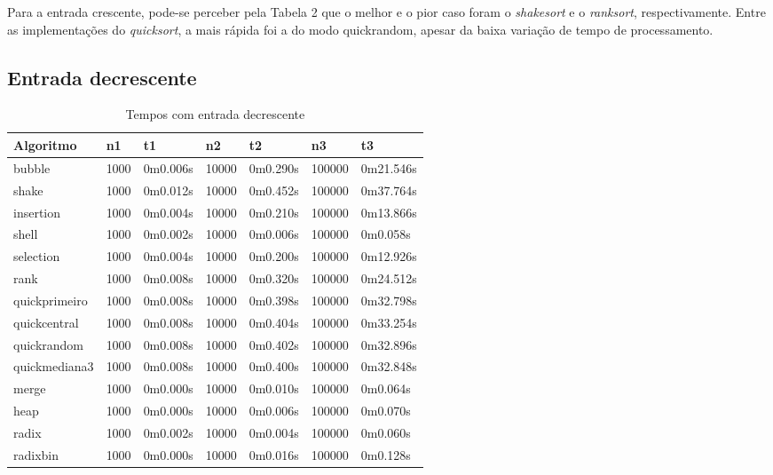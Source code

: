 \documentclass[
	article,			%
	11pt,				%
	oneside,			%
	a4paper,			%
	english,			%
	brazil,				%
	sumario=tradicional
	]{abntex2}
\begin{document}
Para a entrada crescente, pode-se perceber pela Tabela 2 que o melhor e o pior caso foram o \emph{shakesort} e o \emph{ranksort}, respectivamente. Entre as implementações do \emph{quicksort}, a mais rápida foi a do modo quickrandom, apesar da baixa variação de tempo de processamento.

\subsection{Entrada decrescente}

\begin{table}[!h]
\centering
\caption{Tempos com entrada decrescente}
\label{my-label}
\begin{tabular}{|l|l|l|l|l|l|l|}
\hline
Algoritmo     & n1 & t1 & n2 & t2 & n3 & t3 \\ \hline
bubble        & 1000   & 0m0.006s   & 10000   & 0m0.290s   & 100000   & 0m21.546s   \\ \hline
shake         & 1000   & 0m0.012s   & 10000   & 0m0.452s   & 100000   & 0m37.764s   \\ \hline
insertion     & 1000   & 0m0.004s   & 10000   & 0m0.210s   & 100000   & 0m13.866s   \\ \hline
shell         & 1000   & 0m0.002s   & 10000   & 0m0.006s   & 100000   & 0m0.058s   \\ \hline
selection     & 1000   & 0m0.004s   & 10000   & 0m0.200s   & 100000   & 0m12.926s   \\ \hline
rank          & 1000   & 0m0.008s   & 10000   & 0m0.320s   & 100000   & 0m24.512s   \\ \hline
quickprimeiro & 1000   & 0m0.008s   & 10000   & 0m0.398s   & 100000   & 0m32.798s   \\ \hline
quickcentral  & 1000   & 0m0.008s   & 10000   & 0m0.404s   & 100000   & 0m33.254s   \\ \hline
quickrandom   & 1000   & 0m0.008s   & 10000   & 0m0.402s   & 100000   & 0m32.896s   \\ \hline
quickmediana3 & 1000   & 0m0.008s   & 10000   & 0m0.400s   & 100000   & 0m32.848s   \\ \hline
merge         & 1000   & 0m0.000s   & 10000   & 0m0.010s   & 100000   & 0m0.064s   \\ \hline
heap          & 1000   & 0m0.000s   & 10000   & 0m0.006s   & 100000   & 0m0.070s   \\ \hline
radix         & 1000   & 0m0.002s   & 10000   & 0m0.004s   & 100000   & 0m0.060s   \\ \hline
radixbin      & 1000   & 0m0.000s   & 10000   & 0m0.016s   & 100000   & 0m0.128s   \\ \hline
\end{tabular}
\end{table}
\end{document}
